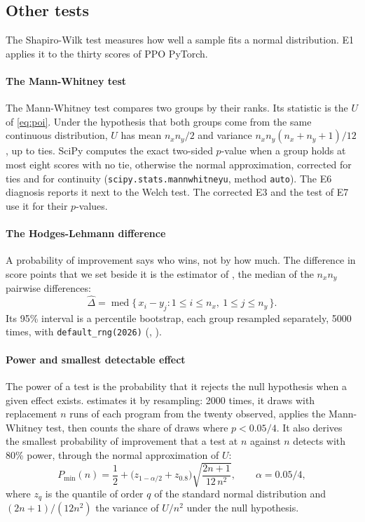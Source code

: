 \subsection{Other tests}\label{sec:autres-tests}
The Shapiro-Wilk test \parencite{shapiro1965analysis} measures how well a sample fits a normal
distribution. E1 applies it to the thirty scores of PPO PyTorch.

\paragraph{The Mann-Whitney test}
The Mann-Whitney test \parencite{mann1947test} compares two groups by their ranks. Its statistic is the $U$ of
\cref{eq:poi}. Under the hypothesis that both groups come from the same continuous distribution, $U$ has mean
$n_xn_y/2$ and variance $n_xn_y(n_x+n_y+1)/12$, up to ties. SciPy computes the exact two-sided $p$-value when
a group holds at most eight scores with no tie, otherwise the normal approximation, corrected for ties and for
continuity (\texttt{scipy.stats.mannwhitneyu}, method \texttt{auto}). The E6 diagnosis reports it next to the
Welch test. The corrected E3 and the test of E7 use it for their $p$-values.

\paragraph{The Hodges-Lehmann difference}
A probability of improvement says who wins, not by how much. The difference in score points that we set
beside it is the estimator of \textcite{hodges1963estimates}, the median of the $n_xn_y$ pairwise differences:
\begin{equation}\label{eq:hl}
  \hat\Delta=\operatorname{med}\{\,x_i-y_j : 1\le i\le n_x,\ 1\le j\le n_y\,\}.
\end{equation}
Its 95\% interval is a percentile bootstrap, each group resampled separately, \num{5000} times, with
\texttt{default\_rng(2026)} (, ).

\paragraph{Power and smallest detectable effect}
The power of a test is the probability that it rejects the null hypothesis when a given effect exists.
 estimates it by resampling: \num{2000} times, it draws with replacement $n$ runs of each
program from the twenty observed, applies the Mann-Whitney test, then counts the share of draws where
$p<0.05/4$. It also derives the smallest probability of improvement that a test at $n$ against $n$ detects with
80\% power, through the normal approximation of $U$:
\begin{equation}\label{eq:mde}
  P_{\min}(n)=\frac12+\bigl(z_{1-\alpha/2}+z_{0.8}\bigr)\sqrt{\frac{2n+1}{12\,n^2}},\qquad
  \alpha=0.05/4,
\end{equation}
where $z_q$ is the quantile of order $q$ of the standard normal distribution and $(2n+1)/(12n^2)$ the variance
of $U/n^2$ under the null hypothesis.

